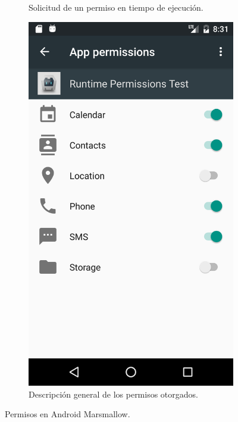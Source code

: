 \begin{figure}[btp]
\begin{subfigure}{0.35\linewidth}
        \caption{Solicitud de un permiso en tiempo de ejecución.}
        \label{fig:ch01:permission-request}
    \end{subfigure}
    \begin{subfigure}{0.35\linewidth}
        \includegraphics[width=\linewidth]{imgs/chapter1/app-permissions}
        \caption{Descripción general de los permisos otorgados.}
	    \label{fig:ch03:app-permissions-overview}
	\end{subfigure}
	\caption{Permisos en Android Marsmallow.}
	\label{fig:ch03:app-permissions-android}
\end{figure}

